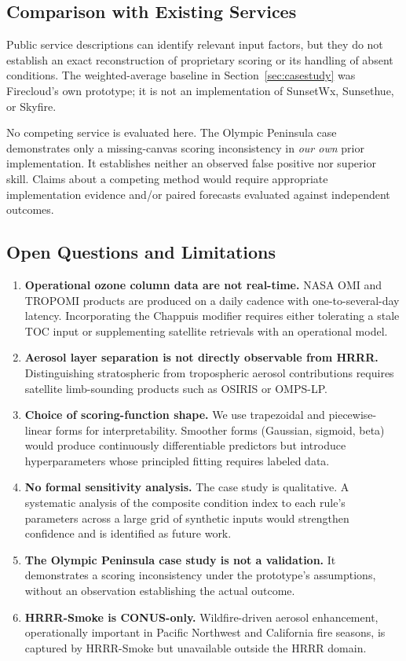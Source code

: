 \documentclass[11pt,a4paper]{article}
\begin{document}
\subsection{Comparison with Existing Services}

Public service descriptions can identify relevant input factors, but they do not establish an exact reconstruction of proprietary scoring or its handling of absent conditions. The weighted-average baseline in Section~\ref{sec:casestudy} was Firecloud's own prototype; it is not an implementation of SunsetWx, Sunsethue, or Skyfire.

No competing service is evaluated here. The Olympic Peninsula case demonstrates only a missing-canvas scoring inconsistency in \emph{our own} prior implementation. It establishes neither an observed false positive nor superior skill. Claims about a competing method would require appropriate implementation evidence and/or paired forecasts evaluated against independent outcomes.

\subsection{Open Questions and Limitations}
\label{sec:openquestions}

\begin{enumerate}
\item \textbf{Operational ozone column data are not real-time.} NASA OMI and TROPOMI products are produced on a daily cadence with one-to-several-day latency. Incorporating the Chappuis modifier requires either tolerating a stale TOC input or supplementing satellite retrievals with an operational model.
\item \textbf{Aerosol layer separation is not directly observable from HRRR.} Distinguishing stratospheric from tropospheric aerosol contributions requires satellite limb-sounding products such as OSIRIS or OMPS-LP.
\item \textbf{Choice of scoring-function shape.} We use trapezoidal and piecewise-linear forms for interpretability. Smoother forms (Gaussian, sigmoid, beta) would produce continuously differentiable predictors but introduce hyperparameters whose principled fitting requires labeled data.
\item \textbf{No formal sensitivity analysis.} The case study is qualitative. A systematic analysis of the composite condition index to each rule's parameters across a large grid of synthetic inputs would strengthen confidence and is identified as future work.
\item \textbf{The Olympic Peninsula case study is not a validation.} It demonstrates a scoring inconsistency under the prototype's assumptions, without an observation establishing the actual outcome.
\item \textbf{HRRR-Smoke is CONUS-only.} Wildfire-driven aerosol enhancement, operationally important in Pacific Northwest and California fire seasons, is captured by HRRR-Smoke but unavailable outside the HRRR domain.
\end{enumerate}
\end{document}
